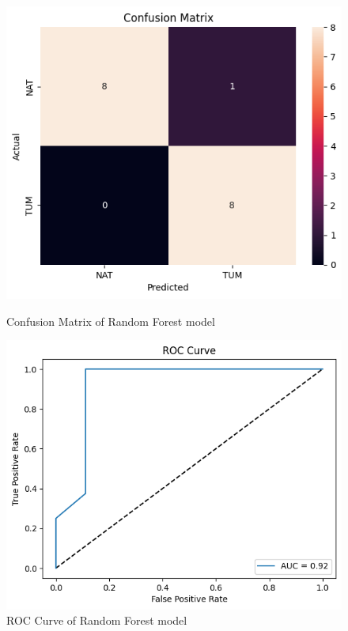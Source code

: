 \documentclass[a4paper,12pt]{article}
\begin{document}
\begin{figure}[H]
	\centering
	\begin{minipage}[b]{0.45\textwidth}
		\centering
		\includegraphics[width=\textwidth]{images/rc.png}
		\caption{Confusion Matrix of Random Forest model}
		\label{fig:confusion_matrix_rf}
	\end{minipage}
	\hfill
	\begin{minipage}[b]{0.45\textwidth}
		\centering
		\includegraphics[width=\textwidth]{images/rr.png}
		\caption{ROC Curve of Random Forest model}
		\label{fig:roc_rf}
	\end{minipage}
\end{figure}
\end{document}
